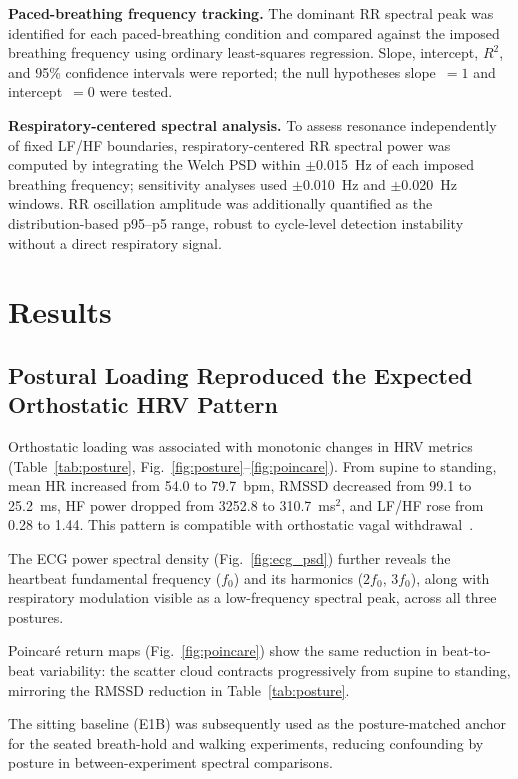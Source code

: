 \documentclass[conference]{IEEEtran}
\begin{document}
\textbf{Paced-breathing frequency tracking.}
The dominant RR spectral peak was identified for each paced-breathing
condition and compared against the imposed breathing frequency using
ordinary least-squares regression.
Slope, intercept, $R^{2}$, and 95\% confidence intervals were
reported; the null hypotheses slope~$=1$ and intercept~$=0$ were
tested.

\textbf{Respiratory-centered spectral analysis.}
To assess resonance independently of fixed LF/HF boundaries,
respiratory-centered RR spectral power was computed by integrating
the Welch PSD within $\pm$0.015~Hz of each imposed breathing
frequency; sensitivity analyses used $\pm$0.010~Hz and
$\pm$0.020~Hz windows.
RR oscillation amplitude was additionally quantified as the
distribution-based p95--p5 range, robust to cycle-level detection
instability without a direct respiratory signal.


\section{Results}
\label{sec:results}

\subsection{Postural Loading Reproduced the Expected Orthostatic HRV Pattern}
\label{ssec:posture}

Orthostatic loading was associated with monotonic changes in HRV
metrics (Table~\ref{tab:posture},
Fig.~\ref{fig:posture}--\ref{fig:poincare}).
From supine to standing, mean HR increased from 54.0 to 79.7~bpm,
RMSSD decreased from 99.1 to 25.2~ms, HF power dropped from 3252.8
to 310.7~ms$^{2}$, and LF/HF rose from 0.28 to 1.44.
This pattern is compatible with orthostatic vagal
withdrawal~\cite{taskforce1996}.

The ECG power spectral density (Fig.~\ref{fig:ecg_psd}) further
reveals the heartbeat fundamental frequency ($f_{0}$) and its
harmonics ($2f_{0}$, $3f_{0}$), along with respiratory modulation
visible as a low-frequency spectral peak, across all three postures.

Poincar\'e return maps (Fig.~\ref{fig:poincare}) show the same
reduction in beat-to-beat variability: the
scatter cloud contracts progressively from supine to standing,
mirroring the RMSSD reduction in
Table~\ref{tab:posture}.

The sitting baseline (E1B) was subsequently used as the
posture-matched anchor for the seated breath-hold and walking
experiments, reducing confounding by posture in between-experiment spectral
comparisons.
\end{document}
